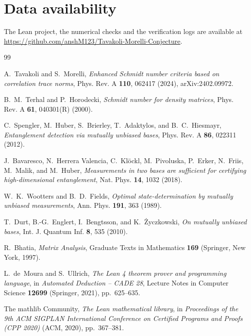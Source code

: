 \documentclass[11pt]{amsart}
\theoremstyle{definition}
\theoremstyle{remark}
\begin{document}
\section*{Data availability}
The Lean project, the numerical checks and the verification logs are available at
\url{https://github.com/anshM123/Tavakoli-Morelli-Conjecture}.

\begin{thebibliography}{99}

A.~Tavakoli and S.~Morelli, \emph{Enhanced Schmidt number criteria based on correlation trace norms},
Phys. Rev. A \textbf{110}, 062417 (2024), arXiv:2402.09972.

B.~M.~Terhal and P.~Horodecki, \emph{Schmidt number for density matrices}, Phys. Rev. A \textbf{61}, 040301(R)
(2000).

C.~Spengler, M.~Huber, S.~Brierley, T.~Adaktylos, and B.~C.~Hiesmayr, \emph{Entanglement detection via mutually
unbiased bases}, Phys. Rev. A \textbf{86}, 022311 (2012).

J.~Bavaresco, N.~Herrera Valencia, C.~Kl\"ockl, M.~Pivoluska, P.~Erker, N.~Friis, M.~Malik, and M.~Huber,
\emph{Measurements in two bases are sufficient for certifying high-dimensional entanglement}, Nat. Phys.
\textbf{14}, 1032 (2018).

W.~K.~Wootters and B.~D.~Fields, \emph{Optimal state-determination by mutually unbiased measurements}, Ann. Phys.
\textbf{191}, 363 (1989).

T.~Durt, B.-G.~Englert, I.~Bengtsson, and K.~\.Zyczkowski, \emph{On mutually unbiased bases}, Int. J. Quantum Inf.
\textbf{8}, 535 (2010).

R.~Bhatia, \emph{Matrix Analysis}, Graduate Texts in Mathematics \textbf{169} (Springer, New York, 1997).

L.~de~Moura and S.~Ullrich, \emph{The Lean 4 theorem prover and programming language}, in \emph{Automated
Deduction -- CADE 28}, Lecture Notes in Computer Science \textbf{12699} (Springer, 2021), pp.~625--635.

The mathlib Community, \emph{The Lean mathematical library}, in \emph{Proceedings of the 9th ACM SIGPLAN
International Conference on Certified Programs and Proofs (CPP 2020)} (ACM, 2020), pp.~367--381.

\end{thebibliography}
\end{document}
